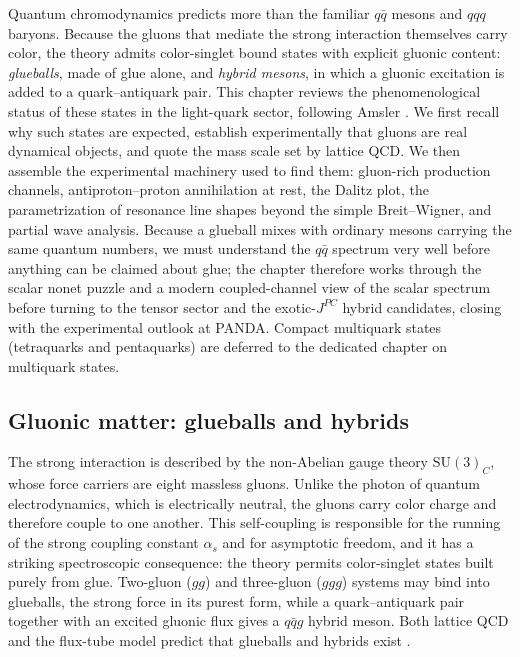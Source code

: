 Quantum chromodynamics predicts more than the familiar $q\bar q$ mesons and
$qqq$ baryons. Because the gluons that mediate the strong interaction themselves
carry color, the theory admits color-singlet bound states with explicit gluonic
content: \emph{glueballs}, made of glue alone, and \emph{hybrid mesons}, in which
a gluonic excitation is added to a quark--antiquark pair. This chapter reviews the
phenomenological status of these states in the light-quark sector, following
Amsler \cite[Ch.~11]{Amsler2018}. We first recall why such states are expected,
establish experimentally that gluons are real dynamical objects, and quote the
mass scale set by lattice QCD. We then assemble the experimental machinery used to
find them: gluon-rich production channels, antiproton--proton annihilation at
rest, the Dalitz plot, the parametrization of resonance line shapes beyond the
simple Breit--Wigner, and partial wave analysis. Because a glueball mixes with
ordinary mesons carrying the same quantum numbers, we must understand the
$q\bar q$ spectrum very well before anything can be claimed about glue; the
chapter therefore works through the scalar nonet puzzle and a modern
coupled-channel view of the scalar spectrum before turning to the tensor sector
and the exotic-$J^{PC}$ hybrid candidates, closing with the experimental outlook
at PANDA. Compact multiquark states (tetraquarks
and pentaquarks) are deferred to the dedicated chapter on multiquark states.

\subsection{Gluonic matter: glueballs and hybrids}
\label{subsec:gluonic_matter}

The strong interaction is described by the non-Abelian gauge theory
$\mathrm{SU(3)}_{C}$, whose force carriers are eight massless gluons. Unlike the
photon of quantum electrodynamics, which is electrically neutral, the gluons carry
color charge and therefore couple to one another. This self-coupling is responsible
for the running of the strong coupling constant $\alpha_s$ and for asymptotic
freedom, and it has a striking spectroscopic consequence: the theory permits
color-singlet states built purely from glue. Two-gluon ($gg$) and three-gluon
($ggg$) systems may bind into glueballs, the strong force in its purest form, while
a quark--antiquark pair together with an excited gluonic flux gives a $q\bar q g$
hybrid meson. Both lattice QCD and the flux-tube model predict that glueballs and
hybrids exist \cite[Ch.~10]{Amsler2018,Amsler2018}.

